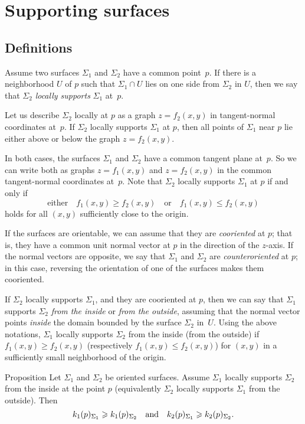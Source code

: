 \chapter{Supporting surfaces}
\label{chap:surface-support}

\section{Definitions}

Assume two surfaces $\Sigma_1$ and $\Sigma_2$ have a common point~$p$.
If there is a neighborhood $U$ of $p$ such that $\Sigma_1\cap U$ lies on one side from $\Sigma_2$ in $U$, then we say that $\Sigma_2$ \emph{locally supports} $\Sigma_1$ at~$p$.

Let us describe $\Sigma_2$ locally at $p$ as a graph $z=f_2(x,y)$ in tangent-normal coordinates at~$p$.
If $\Sigma_2$ locally supports $\Sigma_1$ at $p$, then  all points of $\Sigma_1$ near $p$ lie either above or below the graph $z=f_2(x,y)$.

In both cases, the surfaces $\Sigma_1$ and $\Sigma_2$ have a common tangent plane at~$p$.
So we can write both as graphs $z=f_1(x,y)$ and $z=f_2(x,y)$ in the common tangent-normal coordinates at~$p$.
Note that $\Sigma_2$ locally supports $\Sigma_1$ at $p$ if and only if 
\[\text{either}\quad f_1(x,y)\ge f_2(x,y)
\quad\text{or}\quad
f_1(x,y)\le f_2(x,y)\]
holds for all $(x,y)$ sufficiently close to the origin.

If the surfaces are orientable, we can assume that they are \emph{cooriented} at $p$;
that is, they have a common unit normal vector at $p$ in the direction of the $z$-axis.
If the normal vectors are opposite, we say that $\Sigma_1$ and $\Sigma_2$ are \emph{counteroriented} at $p$;
in this case, reversing the orientation of one of the surfaces makes them cooriented.

If $\Sigma_2$ locally supports $\Sigma_1$, and they are cooriented at $p$,
then we can say that $\Sigma_1$ supports $\Sigma_2$ \emph{from the inside} or \emph{from the outside},
assuming that the normal vector points {}\emph{inside} the domain bounded by the surface $\Sigma_2$ in~$U$.
Using the above notations, $\Sigma_1$ locally supports $\Sigma_2$ from the inside (from the outside)  if $f_1(x,y)\ge f_2(x,y)$ (respectively $f_1(x,y)\le f_2(x,y)$) for $(x,y)$ in a sufficiently small neighborhood of the origin.

\begin{thm}{Proposition}\label{prop:surf-support}
Let $\Sigma_1$ and $\Sigma_2$ be oriented surfaces.
Assume $\Sigma_1$ locally supports $\Sigma_2$ from the inside at the point $p$ (equivalently $\Sigma_2$ locally supports $\Sigma_1$ from the outside).
Then 
\[k_1(p)_{\Sigma_1}\ge k_1(p)_{\Sigma_2}\quad\text{and}\quad k_2(p)_{\Sigma_1}\z\ge k_2(p)_{\Sigma_2}.\]
\end{thm}

